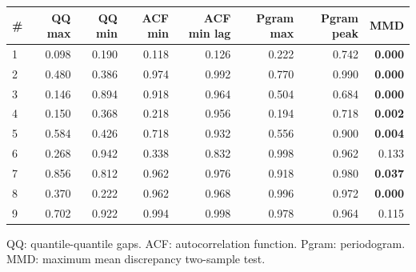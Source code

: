 \documentclass[11pt,a4paper]{article}
\begin{document}
\begin{center}
\begin{tabular}{lrrrrrrr}
\toprule
\# & QQ max & QQ min & ACF min & ACF min lag & Pgram max & Pgram peak & MMD \\
\midrule
1 & 0.098 & 0.190 & 0.118 & 0.126 & 0.222 & 0.742 & \textbf{0.000} \\
2 & 0.480 & 0.386 & 0.974 & 0.992 & 0.770 & 0.990 & \textbf{0.000} \\
3 & 0.146 & 0.894 & 0.918 & 0.964 & 0.504 & 0.684 & \textbf{0.000} \\
4 & 0.150 & 0.368 & 0.218 & 0.956 & 0.194 & 0.718 & \textbf{0.002} \\
5 & 0.584 & 0.426 & 0.718 & 0.932 & 0.556 & 0.900 & \textbf{0.004} \\
6 & 0.268 & 0.942 & 0.338 & 0.832 & 0.998 & 0.962 & 0.133 \\
7 & 0.856 & 0.812 & 0.962 & 0.976 & 0.918 & 0.980 & \textbf{0.037} \\
8 & 0.370 & 0.222 & 0.962 & 0.968 & 0.996 & 0.972 & \textbf{0.000} \\
9 & 0.702 & 0.922 & 0.994 & 0.998 & 0.978 & 0.964 & 0.115 \\
\bottomrule
\end{tabular}
\end{center}

QQ: quantile-quantile gaps. ACF: autocorrelation function. Pgram: periodogram. MMD: maximum mean discrepancy two-sample test.
\end{document}
